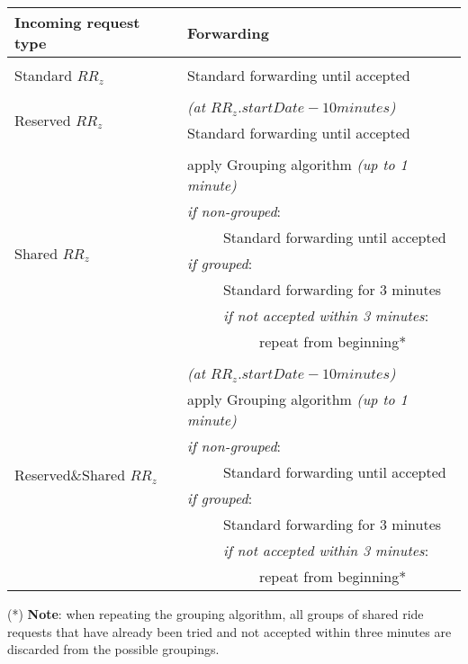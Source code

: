 	\begin{center}
		\begin{tabular}{l|l}
			\textbf{Incoming request type} & \textbf{Forwarding}\\ [1.5ex]
			\hline\hline\\
			Standard $RR_z$
			& Standard forwarding until accepted\\ [1.5ex]
			\hline\\
			\multirow{2}{15em}{Reserved $RR_z$}
			& \textit{(at $RR_z.startDate - 10 minutes$)}\\
			& Standard forwarding until accepted\\ [1.5ex]
			\hline\\
			\multirow{7}{15em}{Shared $RR_z$}
			& apply Grouping algorithm \textit{(up to 1 minute)}\\
			& \textit{if non-grouped}:\\
			& \ \ \ \ \ Standard forwarding until accepted\\
			& \textit{if grouped}:\\
			& \ \ \ \ \ Standard forwarding for 3 minutes\\
			& \ \ \ \ \ \textit{if not accepted within 3 minutes}:\\
			& \ \ \ \ \ \ \ \ \ \ repeat from beginning*\\ [1.5ex]
			\hline\\
			\multirow{8}{15em}{Reserved\&Shared $RR_z$}
			& \textit{(at $RR_z.startDate - 10 minutes$)}\\
			& apply Grouping algorithm \textit{(up to 1 minute)}\\
			& \textit{if non-grouped}:\\
			& \ \ \ \ \ Standard forwarding until accepted\\
			& \textit{if grouped}:\\
			& \ \ \ \ \ Standard forwarding for 3 minutes\\
			& \ \ \ \ \ \textit{if not accepted within 3 minutes}:\\
			& \ \ \ \ \ \ \ \ \ \ repeat from beginning*\\ [1.5ex]
			\hline
		\end{tabular}
	\end{center}
	
	(*) \textbf{Note}: when repeating the grouping algorithm, all groups of shared ride requests that have already been tried and not accepted within three minutes are discarded from the possible groupings.
	

